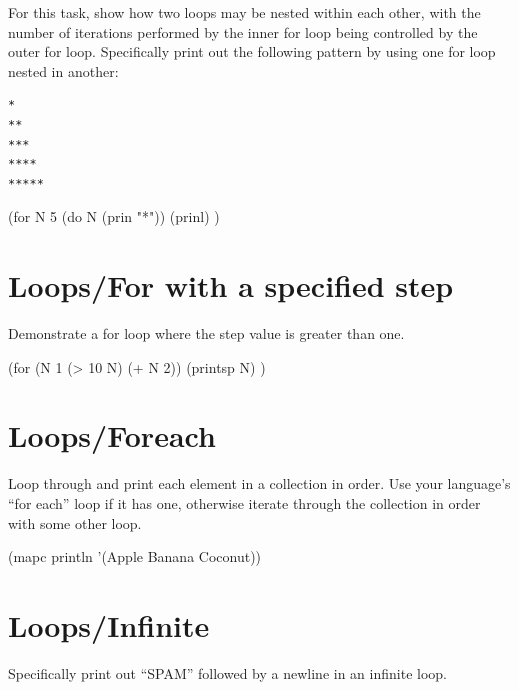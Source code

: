 \begin{itemize}
For this task, show how two loops may be nested within each other, with
the number of iterations performed by the inner for loop being
controlled by the outer for loop. Specifically print out the following
pattern by using one for loop nested in another:

\begin{verbatim}
*
**
***
****
*****
\end{verbatim}


\begin{wideverbatim}

(for N 5
   (do N (prin "*"))
   (prinl) )

\end{wideverbatim}

\pagebreak{}
\section*{Loops/For with a specified step}

Demonstrate a for loop where the step value is greater than one.

\begin{wideverbatim}

(for (N 1 (> 10 N) (+ N 2))
   (printsp N) )

\end{wideverbatim}

\pagebreak{}
\section*{Loops/Foreach}

Loop through and print each element in a collection in order. Use your
language's ``for each'' loop if it has one, otherwise iterate through
the collection in order with some other loop.


\begin{wideverbatim}

(mapc println '(Apple Banana Coconut))

\end{wideverbatim}

\pagebreak{}
\section*{Loops/Infinite}

Specifically print out ``SPAM'' followed by a newline in an infinite
loop.

\begin{wideverbatim}


\end{wideverbatim}
\end{itemize}
